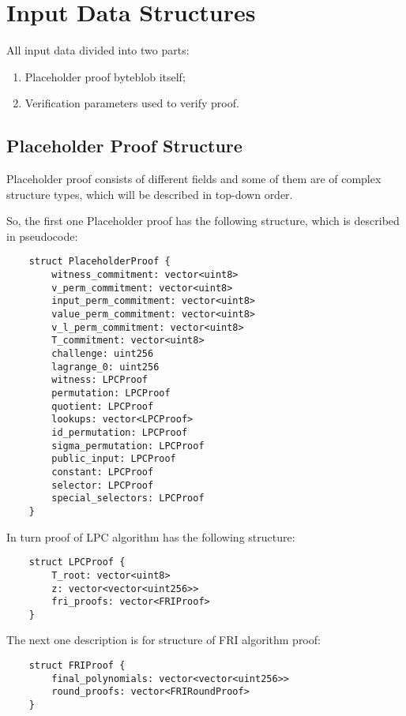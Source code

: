 \section{Input Data Structures}

All input data divided into two parts:

\begin{enumerate}
    \item Placeholder proof byteblob itself;
    \item Verification parameters used to verify proof.
\end{enumerate}

\subsection{Placeholder Proof Structure}

Placeholder proof consists of different fields and some of them are of complex structure types, which will be described in top-down order.

So, the first one Placeholder proof has the following structure, which is described in pseudocode:

\begin{verbatim}
    struct PlaceholderProof {
        witness_commitment: vector<uint8>
        v_perm_commitment: vector<uint8>
        input_perm_commitment: vector<uint8>
        value_perm_commitment: vector<uint8>
        v_l_perm_commitment: vector<uint8>
        T_commitment: vector<uint8>
        challenge: uint256
        lagrange_0: uint256
        witness: LPCProof
        permutation: LPCProof
        quotient: LPCProof
        lookups: vector<LPCProof>
        id_permutation: LPCProof
        sigma_permutation: LPCProof
        public_input: LPCProof
        constant: LPCProof
        selector: LPCProof
        special_selectors: LPCProof
    }
\end{verbatim}

In turn proof of LPC algorithm has the following structure:

\begin{verbatim}
    struct LPCProof {
        T_root: vector<uint8>
        z: vector<vector<uint256>>
        fri_proofs: vector<FRIProof>
    }
\end{verbatim}

The next one description is for structure of FRI algorithm proof:

\begin{verbatim}
    struct FRIProof {
        final_polynomials: vector<vector<uint256>>
        round_proofs: vector<FRIRoundProof>
    }
\end{verbatim}

